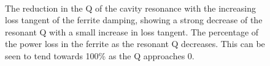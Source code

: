 \begin{figure}
\begin{center}
\\
\end{center}
\caption{ The reduction in the Q of the cavity resonance with the increasing loss tangent of the ferrite damping, showing a strong decrease of the resonant Q with a small increase in loss tangent.  The percentage of the power loss in the ferrite as the resonant Q decreases. This can be seen to tend towards 100\% as the Q approaches 0.}
\label{fig:screen_res_alterations}
\end{figure}

